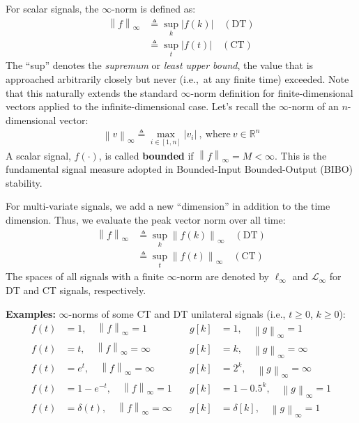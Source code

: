 \documentclass[11pt, a4paper, twoside]{article}
\newcommand{\norm}[1]{\left\lVert#1\right\rVert}
\newcommand{\abs}[1]{\left\lvert#1\right\rvert}
\theoremstyle{plain}
\theoremstyle{definition}
\begin{document}
For scalar signals, the $\infty$-norm is defined as:
%
\begin{align*}
	\norm{f}_{\infty} &\triangleq \sup_{k} \abs{f(k)} \quad (\mathrm{DT})
	\\
	&\triangleq \sup_{t} \abs{f(t)} \quad (\mathrm{CT})
\end{align*}
%
The ``sup'' denotes the \textit{supremum} or \textit{least upper bound}, the value
that is approached arbitrarily closely but never (i.e.,\ at any finite time) exceeded.
Note that this naturally extends the standard $\infty$-norm definition for finite-dimensional
vectors applied to the infinite-dimensional case. Let's recall 
the $\infty$-norm of an $n$-dimensional vector:
%
\begin{align*}
\norm{v}_{\infty} \triangleq \max_{i\in[1,n]} \abs{v_i} \ , \ \mathrm{where} \ v \in \mathbb{R}^n 
\end{align*}
% 
A scalar signal, $f(\cdot)$, is called \textbf{bounded} if $\norm{f}_{\infty} = M < \infty$. This is the
fundamental signal measure adopted in Bounded-Input Bounded-Output (BIBO) stability. 

For multi-variate signals, we add a new ``dimension'' in addition to the
time dimension. Thus, we evaluate the peak vector norm over all time:
%
\begin{align*}
	\norm{f}_{\infty} &\triangleq \sup_{k} \norm{f(k)}_{\infty} \quad (\mathrm{DT})
	\\
	&\triangleq \sup_{t} \norm{f(t)}_{\infty} \quad (\mathrm{CT})
\end{align*}
%
The spaces of all signals with a finite $\infty$-norm are denoted by 
$\ell_{\infty}$ and $\mathcal{L}_{\infty}$ for DT and CT signals, respectively.

\textbf{Examples:} $\infty$-norms of some CT and DT unilateral signals (i.e., $t \geq 0$, $k \geq 0$):
%
\begin{align*}
	f(t) &= 1 , \quad \norm{f}_{\infty} = 1  &\quad g[k] &= 1 , \quad \norm{g}_{\infty} = 1 \\
	f(t) &= t , \quad \norm{f}_{\infty} = \infty &\quad g[k] &= k , \quad \norm{g}_{\infty} = \infty \\
	f(t) &= e^t , \quad \norm{f}_{\infty} = \infty &\quad g[k] &= 2^k , \quad \norm{g}_{\infty} = \infty \\
	f(t) &= 1 - e^{-t} , \quad \norm{f}_{\infty} = 1 &\quad g[k] &= 1 - 0.5^k , \quad \norm{g}_{\infty} = 1 \\
	f(t) &= \delta(t) , \quad \norm{f}_{\infty} = \infty &\quad g[k] &= \delta[k] , \quad \norm{g}_{\infty} = 1
\end{align*}
\end{document}
